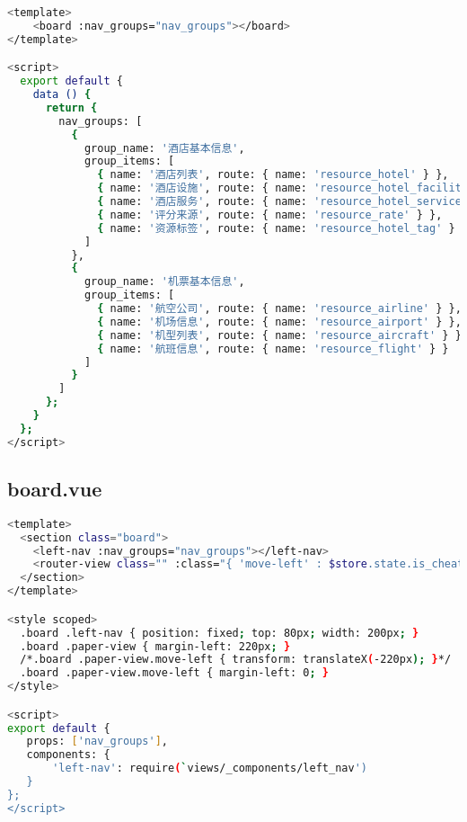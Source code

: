 \begin{lstlisting}[language=bash]
<template>
    <board :nav_groups="nav_groups"></board>
</template>

<script>
  export default {
    data () {
      return {
        nav_groups: [
          {
            group_name: '酒店基本信息',
            group_items: [
              { name: '酒店列表', route: { name: 'resource_hotel' } },
              { name: '酒店设施', route: { name: 'resource_hotel_facility' } },
              { name: '酒店服务', route: { name: 'resource_hotel_service' } },
              { name: '评分来源', route: { name: 'resource_rate' } },
              { name: '资源标签', route: { name: 'resource_hotel_tag' } }
            ]
          },
          {
            group_name: '机票基本信息',
            group_items: [
              { name: '航空公司', route: { name: 'resource_airline' } },
              { name: '机场信息', route: { name: 'resource_airport' } },
              { name: '机型列表', route: { name: 'resource_aircraft' } },
              { name: '航班信息', route: { name: 'resource_flight' } }
            ]
          }
        ]
      };
    }
  };
</script>
\end{lstlisting}




\subsection{board.vue}





\begin{lstlisting}[language=bash]
<template>
  <section class="board">
    <left-nav :nav_groups="nav_groups"></left-nav>
    <router-view class="" :class="{ 'move-left' : $store.state.is_cheat_sheet_show }"></router-view>
  </section>
</template>

<style scoped>
  .board .left-nav { position: fixed; top: 80px; width: 200px; }
  .board .paper-view { margin-left: 220px; }
  /*.board .paper-view.move-left { transform: translateX(-220px); }*/
  .board .paper-view.move-left { margin-left: 0; }
</style>

<script>
export default {
   props: ['nav_groups'],
   components: {
       'left-nav': require(`views/_components/left_nav')
   }
};
</script>
\end{lstlisting}






\begin{lstlisting}[language=bash]

\end{lstlisting}



